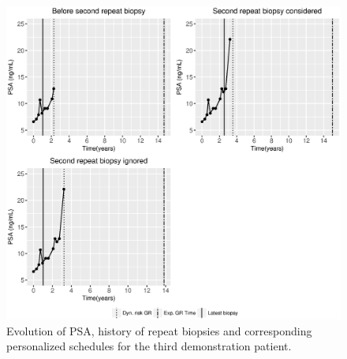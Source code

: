 \begin{figure}
\centerline{\includegraphics[width=\columnwidth]{images/prias_demo/case_2340.eps}}
\caption{Evolution of PSA, history of repeat biopsies and corresponding personalized schedules for the third demonstration patient.}
\label{web_fig : prias_demo_pid_2340}
\end{figure}